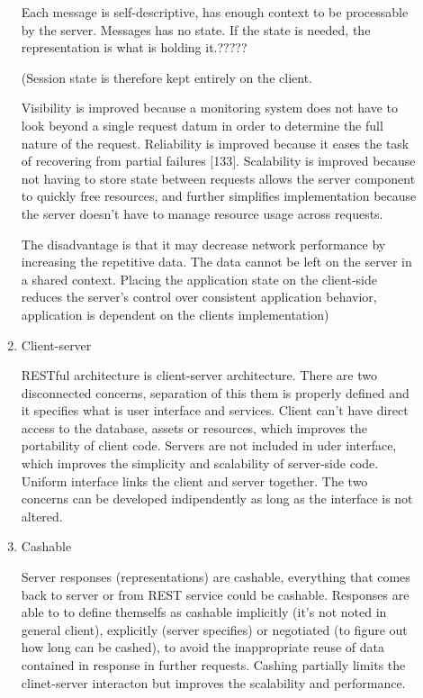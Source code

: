 \begin{description}
\begin{enumerate}
Each message is self-descriptive, has enough context to be processable by the server. Messages has no state. If the state is needed, the representation is what is holding it.?????

(Session state is therefore kept entirely on the client.

Visibility is improved because a monitoring system does not have to look beyond a single request datum in order to determine the full nature of the request. Reliability is improved because it eases the task of recovering from partial failures [133]. Scalability is improved because not having to store state between requests allows the server component to quickly free resources, and further simplifies implementation because the server doesn't have to manage resource usage across requests.

The disadvantage is that it may decrease network performance by increasing the repetitive data. The data cannot be left on the server in a shared context. Placing the application state on the client-side reduces the server's control over consistent application behavior, application is dependent on the clients implementation) %

\item Client-server

RESTful architecture is client-server architecture. There are two disconnected concerns, separation of this them is properly defined and it specifies what is user interface and services. Client can’t have direct access to the database, assets or resources, which improves the portability of client code. Servers are not included in uder interface, which improves the simplicity and scalability of server-side code. Uniform interface links the client and server together. The two concerns can be developed indipendently as long as the interface is not altered. 

\item Cashable

Server responses (representations) are cashable, everything that comes back to server or from REST service could be cashable. Responses are able to to define themselfs as cashable implicitly (it’s not noted in general client), explicitly (server specifies) or negotiated (to figure out how long can be cashed), to avoid the inappropriate reuse of data contained in response in further requests. Cashing partially limits the clinet-server interacton but improves the scalability and performance.


\end{enumerate}
\end{description}
